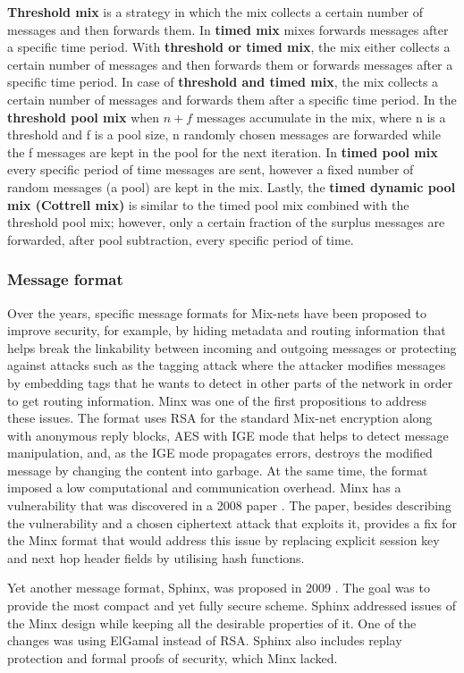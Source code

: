 \textbf{Threshold mix} is a strategy in which the mix collects a certain number of messages and then forwards them. In \textbf{timed mix} mixes forwards messages after a specific time period. With \textbf{threshold or timed mix}, the mix either collects a certain number of messages and then forwards them or forwards messages after a specific time period. In case of \textbf{threshold and timed mix}, the mix collects a certain number of messages and forwards them after a specific time period. In the \textbf{threshold pool mix} when $n+f$ messages accumulate in the mix, where n is a threshold and f is a pool size, n randomly chosen messages are forwarded while the f messages are kept in the pool for the next iteration. In \textbf{timed pool mix} every specific period of time messages are sent, however a fixed number of random messages (a pool) are kept in the mix. Lastly, the \textbf{timed dynamic pool mix (Cottrell mix)} is similar to the timed pool mix combined with the threshold pool mix; however, only a certain fraction of the surplus messages are forwarded, after pool subtraction, every specific period of time.

\subsubsection{Message format}
Over the years, specific message formats for Mix-nets have been proposed to improve security, for example, by hiding metadata and routing information that helps break the linkability between incoming and outgoing messages or protecting against attacks such as the tagging attack where the attacker modifies messages by embedding tags that he wants to detect in other parts of the network in order to get routing information. Minx \cite{minx} was one of the first propositions to address these issues. The format uses RSA for the standard Mix-net encryption along with anonymous reply blocks, AES with IGE mode that helps to detect message manipulation, and, as the IGE mode propagates errors, destroys the modified message by changing the content into garbage. At the same time, the format imposed a low computational and communication overhead. Minx has a vulnerability that was discovered in a 2008 paper \cite{fix-minx}. The paper, besides describing the vulnerability and a chosen ciphertext attack that exploits it, provides a fix for the Minx format that would address this issue by replacing explicit session key and next hop header fields by utilising hash functions.

Yet another message format, Sphinx, was proposed in 2009 \cite{sphinx}. The goal was to provide the most compact and yet fully secure scheme. Sphinx addressed issues of the Minx design while keeping all the desirable properties of it. One of the changes was using ElGamal instead of RSA. Sphinx also includes replay protection and formal proofs of security, which Minx lacked.

